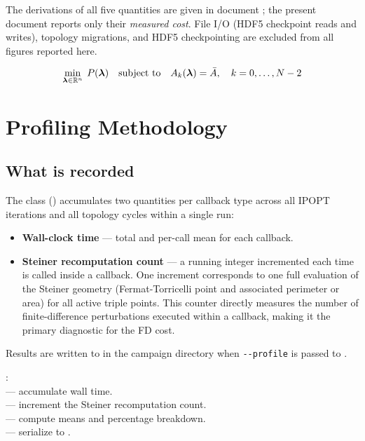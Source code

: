 \documentclass[11pt,a4paper]{article}
\begin{document}
\noindent
The derivations of all five quantities are given in document
; the present document reports only
their \emph{measured cost}.  File I/O (HDF5 checkpoint reads and writes), topology migrations, and
HDF5 checkpointing are excluded from all figures reported here.

\begin{equation}
  \min_{\boldsymbol{\lambda} \in \mathbb{R}^n}\; P(\boldsymbol{\lambda})
  \quad\text{subject to}\quad
  A_k(\boldsymbol{\lambda}) = \bar{A},\quad k = 0,\ldots,N-2
  \label{eq:nlp}
\end{equation}

\section{Profiling Methodology}
\label{sec:method}

\subsection{What is recorded}

The class  () accumulates
two quantities per callback type across all IPOPT iterations and all
topology cycles within a single run:

\begin{itemize}[noitemsep]
  \item \textbf{Wall-clock time} --- total and per-call mean for each
        callback.
  \item \textbf{Steiner recomputation count} --- a running integer
        incremented each time  is called inside a
        callback.  One increment corresponds to one full evaluation of the
        Steiner geometry (Fermat-Torricelli point and associated perimeter
        or area) for all active triple points.  This counter directly
        measures the number of finite-difference perturbations executed
        within a callback, making it the primary diagnostic for the FD
        cost.
\end{itemize}

Results are written to  in the campaign
directory when \texttt{-{}-profile} is passed to
.

\begin{tcolorbox}[colback=blue!4!white, colframe=blue!40!black,
                  title={Code: profiling accumulator}, fontupper=\small]
: \\[2pt]
 --- accumulate wall time.\\
 --- increment the Steiner recomputation count.\\
 --- compute means and percentage breakdown.\\
 --- serialize to .
\end{tcolorbox}
\end{document}
